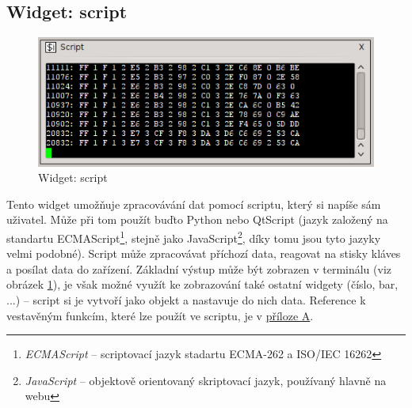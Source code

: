 \documentclass[12pt, a4paper, oneside]{article}
\newcommand{\It}{\textit}  %
\begin{document}
\subsection{Widget: script}
\begin{figure}[h]
\begin{center}
\includegraphics[scale=0.8]{img/w_script.png}
\caption{Widget: script}
\label{script_w}
\end{center}
\end{figure}
Tento widget umožňuje zpracovávání dat pomocí scriptu, který si napíše sám uživatel. Může při tom použít buďto Python nebo QtScript\cite{qtscript} (jazyk založený na standartu ECMAScript\footnote{\It{ECMAScript} -- scriptovací jazyk stadartu ECMA-262 a ISO/IEC 16262}, stejně jako JavaScript\footnote{\It{JavaScript} -- objektově orientovaný skriptovací jazyk, používaný hlavně na webu}, díky tomu jsou tyto jazyky velmi podobné). Script může zpracovávat příchozí data, reagovat na stisky kláves a posílat data do zařízení. Základní výstup může být zobrazen v terminálu (viz obrázek \ref{script_w}), je však možné využít ke zobrazování také ostatní widgety (číslo, bar, ...) -- script si je vytvoří jako objekt a nastavuje do nich data. Reference k vestavěným funkcím, které lze použít ve scriptu, je v \hyperref[script_ref]{příloze A}.
\end{document}
